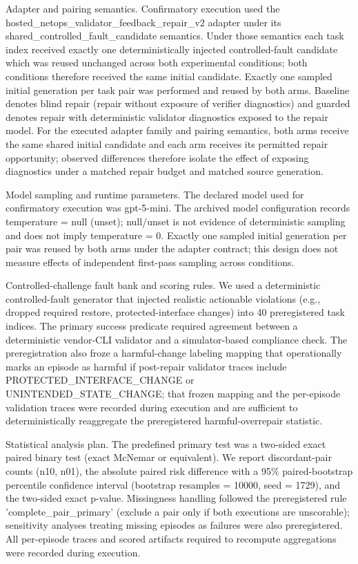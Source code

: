 \documentclass[conference]{IEEEtran}
\begin{document}
Adapter and pairing semantics. Confirmatory execution used the hosted\_netops\_validator\_feedback\_repair\_v2 adapter under its shared\_controlled\_fault\_candidate semantics. Under those semantics each task index received exactly one deterministically injected controlled-fault candidate which was reused unchanged across both experimental conditions; both conditions therefore received the same initial candidate. Exactly one sampled initial generation per task pair was performed and reused by both arms. Baseline denotes blind repair (repair without exposure of verifier diagnostics) and guarded denotes repair with deterministic validator diagnostics exposed to the repair model. For the executed adapter family and pairing semantics, both arms receive the same shared initial candidate and each arm receives its permitted repair opportunity; observed differences therefore isolate the effect of exposing diagnostics under a matched repair budget and matched source generation.

Model sampling and runtime parameters. The declared model used for confirmatory execution was gpt-5-mini. The archived model configuration records temperature = null (unset); null/unset is not evidence of deterministic sampling and does not imply temperature = 0. Exactly one sampled initial generation per pair was reused by both arms under the adapter contract; this design does not measure effects of independent first-pass sampling across conditions.

Controlled-challenge fault bank and scoring rules. We used a deterministic controlled-fault generator that injected realistic actionable violations (e.g., dropped required restore, protected-interface changes) into 40 preregistered task indices. The primary success predicate required agreement between a deterministic vendor-CLI validator and a simulator-based compliance check. The preregistration also froze a harmful-change labeling mapping that operationally marks an episode as harmful if post-repair validator traces include PROTECTED\_INTERFACE\_CHANGE or UNINTENDED\_STATE\_CHANGE; that frozen mapping and the per-episode validation traces were recorded during execution and are sufficient to deterministically reaggregate the preregistered harmful-overrepair statistic.

Statistical analysis plan. The predefined primary test was a two-sided exact paired binary test (exact McNemar or equivalent). We report discordant-pair counts (n10, n01), the absolute paired risk difference with a 95\% paired-bootstrap percentile confidence interval (bootstrap resamples = 10000, seed = 1729), and the two-sided exact p-value. Missingness handling followed the preregistered rule 'complete\_pair\_primary' (exclude a pair only if both executions are unscorable); sensitivity analyses treating missing episodes as failures were also preregistered. All per-episode traces and scored artifacts required to recompute aggregations were recorded during execution.
\end{document}
